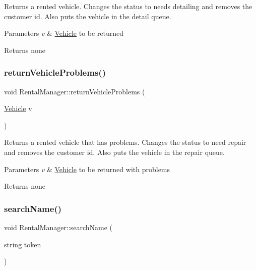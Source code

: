 Returns a rented vehicle. Changes the status to needs detailing and removes the customer id. Also puts the vehicle in the detail queue.


\begin{DoxyParams}{Parameters}
{\em v} & \hyperlink{class_vehicle}{Vehicle} to be returned \\
\hline
\end{DoxyParams}
\begin{DoxyReturn}{Returns}
none 
\end{DoxyReturn}
\mbox{\label{class_rental_manager_afcb0495ecb6cca4d239a14ded559bb0a}} 
\subsubsection{\texorpdfstring{return\+Vehicle\+Problems()}{returnVehicleProblems()}}
{\footnotesize\ttfamily void Rental\+Manager\+::return\+Vehicle\+Problems (\begin{DoxyParamCaption}\item[{\hyperlink{class_vehicle}{Vehicle}}]{v }\end{DoxyParamCaption})}

Returns a rented vehicle that has problems. Changes the status to need repair and removes the customer id. Also puts the vehicle in the repair queue.


\begin{DoxyParams}{Parameters}
{\em v} & \hyperlink{class_vehicle}{Vehicle} to be returned with problems \\
\hline
\end{DoxyParams}
\begin{DoxyReturn}{Returns}
none 
\end{DoxyReturn}
\mbox{\label{class_rental_manager_af54e7a73a0419847843bb90b81cf09ff}} 
\subsubsection{\texorpdfstring{search\+Name()}{searchName()}}
{\footnotesize\ttfamily void Rental\+Manager\+::search\+Name (\begin{DoxyParamCaption}\item[{string}]{token }\end{DoxyParamCaption})}

